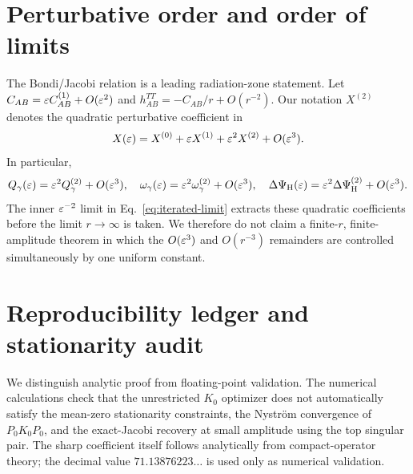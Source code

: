 \section{Perturbative order and order of limits}
The Bondi/Jacobi relation is a leading radiation-zone statement. Let $C_{AB}=\varepsilon C_{AB}^{(1)}+O(\varepsilon^2)$ and $h_{AB}^{TT}=-C_{AB}/r+O(r^{-2})$. Our notation $X^{(2)}$ denotes the quadratic perturbative coefficient in
\[
X(\varepsilon)=X^{(0)}+\varepsilon X^{(1)}+\varepsilon^2X^{(2)}+O(\varepsilon^3).
\]
In particular,
\[
Q_\gamma(\varepsilon)=\varepsilon^2Q_\gamma^{(2)}+O(\varepsilon^3),\quad
\omega_\gamma(\varepsilon)=\varepsilon^2\omega_\gamma^{(2)}+O(\varepsilon^3),\quad
\Delta\Psi_{\rm H}(\varepsilon)=\varepsilon^2\Delta\Psi_{\rm H}^{(2)}+O(\varepsilon^3).
\]
The inner $\varepsilon^{-2}$ limit in Eq.~\eqref{eq:iterated-limit} extracts these quadratic coefficients before the limit $r\to\infty$ is taken. We therefore do not claim a finite-$r$, finite-amplitude theorem in which the $O(\varepsilon^3)$ and $O(r^{-3})$ remainders are controlled simultaneously by one uniform constant.

\section{Reproducibility ledger and stationarity audit}
We distinguish analytic proof from floating-point validation. The numerical calculations check that the unrestricted $K_0$ optimizer does not automatically satisfy the mean-zero stationarity constraints, the Nystr\"om convergence of $P_0K_0P_0$, and the exact-Jacobi recovery at small amplitude using the top singular pair. The sharp coefficient itself follows analytically from compact-operator theory; the decimal value $71.13876223\ldots$ is used only as numerical validation.

